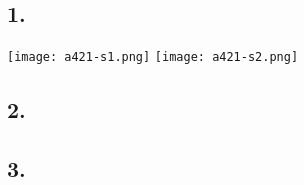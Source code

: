 \subsection*{1.}
\texttt{[image: a421-s1.png]}
\texttt{[image: a421-s2.png]}

\subsection*{2.}

\subsection*{3.}
